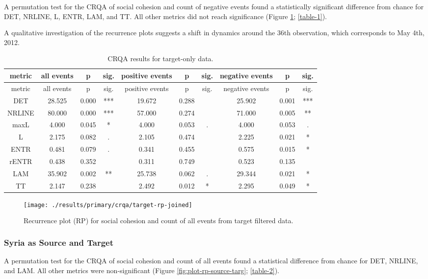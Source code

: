 \documentclass[
  english,
  man]{apa6}
\begin{document}
A permutation test for the CRQA of social cohesion and count of negative events
found a statistically significant difference from chance for DET, NRLINE, L,
ENTR, LAM, and TT. All other metrics did not reach significance (Figure
\ref{fig:plot-rp-targ}; \autoref{table-1}).

A qualitative investigation of the recurrence plots suggests a shift in dynamics
around the 36th observation, which corresponds to May 4th, 2012.

\begin{longtable}[]{@{}cccccccccc@{}}
\caption{\label{table-1}CRQA results for target-only data.}\tabularnewline
\toprule
metric & all events & p & sig. & positive events & p & sig. & negative events & p & sig.\tabularnewline
\midrule
\endfirsthead
\toprule
metric & all events & p & sig. & positive events & p & sig. & negative events & p & sig.\tabularnewline
\midrule
\endhead
DET & 28.525 & 0.000 & *** & 19.672 & 0.288 & & 25.902 & 0.001 & ***\tabularnewline
NRLINE & 80.000 & 0.000 & *** & 57.000 & 0.274 & & 71.000 & 0.005 & **\tabularnewline
maxL & 4.000 & 0.045 & * & 4.000 & 0.053 & . & 4.000 & 0.053 & .\tabularnewline
L & 2.175 & 0.082 & . & 2.105 & 0.474 & & 2.225 & 0.021 & *\tabularnewline
ENTR & 0.481 & 0.079 & . & 0.341 & 0.455 & & 0.575 & 0.015 & *\tabularnewline
rENTR & 0.438 & 0.352 & & 0.311 & 0.749 & & 0.523 & 0.135 &\tabularnewline
LAM & 35.902 & 0.002 & ** & 25.738 & 0.062 & . & 29.344 & 0.021 & *\tabularnewline
TT & 2.147 & 0.238 & & 2.492 & 0.012 & * & 2.295 & 0.049 & *\tabularnewline
\bottomrule
\end{longtable}

\begin{figure}
\texttt{[image: ./results/primary/crqa/target-rp-joined]} \caption{Recurrence plot (RP) for social cohesion and count of all events from target filtered data.}\label{fig:plot-rp-targ}
\end{figure}

\hypertarget{syria-as-source-and-target}{%
\subsubsection{Syria as Source and Target}\label{syria-as-source-and-target}}

A permutation test for the CRQA of social cohesion and count of all events found
a statistical difference from chance for DET, NRLINE, and LAM. All other metrics
were non-significant (Figure \ref{fig:plot-rp-source-targ};
\autoref{table-2}).
\end{document}
